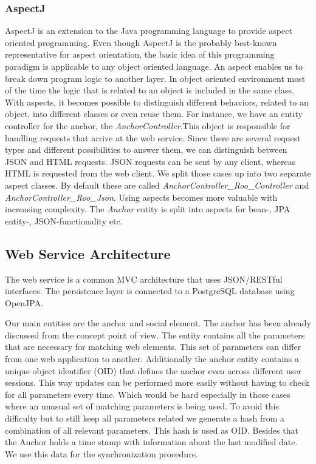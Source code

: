 \subsubsection*{AspectJ}
	AspectJ is an extension to the Java programming language to provide aspect oriented programming. Even though AspectJ is the probably best-known representative for aspect orientation, the basic idea of this programming paradigm is applicable to any object oriented language.
	An aspect enables us to break down program logic to another layer. In object oriented environment most of the time the logic that is related to an object is included in the same class. With aspects, it becomes possible to distinguish different behaviors, related to an object, into different classes or even reuse them. 
	For instance, we have an entity controller for the anchor, the \textit{AnchorController}.This object is responsible for handling requests that arrive at the web service. Since there are several request types and different possibilities to answer them, we can distinguish between JSON and HTML requests. JSON requests can be sent by any client, whereas HTML is requested from the web client. We split those cases up into two separate aspect classes. By default these are called \textit{AnchorController\_Roo\_Controller} and \textit{AnchorController\_Roo\_Json}. 
	Using aspects becomes more valuable with increasing complexity. The \textit{Anchor} entity is split into aspects for bean-, JPA entity-, JSON-functionality etc.

\newpage
\subsection{Web Service Architecture}\label{ws-architecture-intro}
The web service is a common MVC architecture that uses JSON/RESTful interfaces. The persistence layer is connected to a PostgreSQL database using OpenJPA. 

Our main entities are the anchor and social element. The anchor has been already discussed from the concept point of view. The entity contains all the parameters that are necessary for matching web elements. This set of parameters can differ from one web application to another. Additionally the anchor entity contains a unique object identifier (OID) that defines the anchor even across different user sessions. This way updates can be performed more easily without having to check for all parameters every time. Which would be hard especially in those cases where an unusual set of matching parameters is being used. To avoid this difficulty but to still keep all parameters related we generate a hash from a combination of all relevant parameters. This hash is used as OID. 
Besides that the Anchor holds a time stamp with information about the last modified date. We use this data for the synchronization procedure. 

